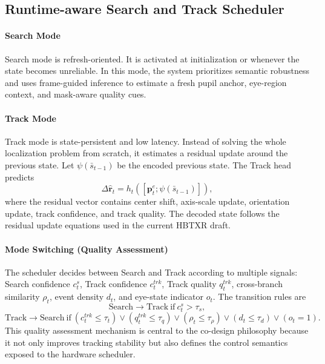 \documentclass[journal]{IEEEtran}
\begin{document}
\subsection{Runtime-aware Search and Track Scheduler}
\paragraph*{Search Mode}
Search mode is refresh-oriented. It is activated at initialization or whenever the state becomes unreliable. In this mode, the system prioritizes semantic robustness and uses frame-guided inference to estimate a fresh pupil anchor, eye-region context, and mask-aware quality cues.

\paragraph*{Track Mode}
Track mode is state-persistent and low latency. Instead of solving the whole localization problem from scratch, it estimates a residual update around the previous state. Let $\psi(\bar s_{t-1})$ be the encoded previous state. The Track head predicts
\begin{equation}
\Delta \hat{\mathbf{r}}_t = h_t([\mathbf{p}^e_t;\psi(\bar s_{t-1})]),
\end{equation}
where the residual vector contains center shift, axis-scale update, orientation update, track confidence, and track quality. The decoded state follows the residual update equations used in the current HBTXR draft.

\paragraph*{Mode Switching (Quality Assessment)}
The scheduler decides between Search and Track according to multiple signals: Search confidence $c_t^s$, Track confidence $c_t^{trk}$, Track quality $q_t^{trk}$, cross-branch similarity $\rho_t$, event density $d_t$, and eye-state indicator $o_t$. The transition rules are
\begin{equation}
\text{Search}\rightarrow\text{Track}\ \text{if}\ c_t^s > \tau_s,
\end{equation}
\begin{equation}
\text{Track}\rightarrow\text{Search}\ \text{if}\ (c_t^{trk}\le\tau_t)\vee(q_t^{trk}\le\tau_q)\vee(\rho_t\le\tau_\rho)\vee(d_t\le\tau_d)\vee(o_t=1).
\end{equation}
This quality assessment mechanism is central to the co-design philosophy because it not only improves tracking stability but also defines the control semantics exposed to the hardware scheduler.
\end{document}
